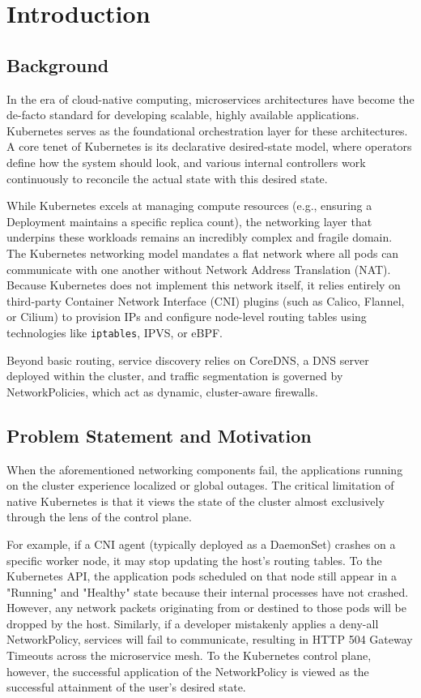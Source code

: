 \documentclass[12pt,a4paper]{article}
\begin{document}
\newpage
\tableofcontents
\newpage

\section{Introduction}
\onehalfspacing
\subsection{Background}
In the era of cloud-native computing, microservices architectures have become the de-facto standard for developing scalable, highly available applications. Kubernetes serves as the foundational orchestration layer for these architectures. A core tenet of Kubernetes is its declarative desired-state model, where operators define how the system should look, and various internal controllers work continuously to reconcile the actual state with this desired state. 

While Kubernetes excels at managing compute resources (e.g., ensuring a Deployment maintains a specific replica count), the networking layer that underpins these workloads remains an incredibly complex and fragile domain. The Kubernetes networking model mandates a flat network where all pods can communicate with one another without Network Address Translation (NAT). Because Kubernetes does not implement this network itself, it relies entirely on third-party Container Network Interface (CNI) plugins (such as Calico, Flannel, or Cilium) to provision IPs and configure node-level routing tables using technologies like \texttt{iptables}, IPVS, or eBPF. 

Beyond basic routing, service discovery relies on CoreDNS, a DNS server deployed within the cluster, and traffic segmentation is governed by NetworkPolicies, which act as dynamic, cluster-aware firewalls.

\subsection{Problem Statement and Motivation}
When the aforementioned networking components fail, the applications running on the cluster experience localized or global outages. The critical limitation of native Kubernetes is that it views the state of the cluster almost exclusively through the lens of the control plane. 

For example, if a CNI agent (typically deployed as a DaemonSet) crashes on a specific worker node, it may stop updating the host's routing tables. To the Kubernetes API, the application pods scheduled on that node still appear in a "Running" and "Healthy" state because their internal processes have not crashed. However, any network packets originating from or destined to those pods will be dropped by the host. Similarly, if a developer mistakenly applies a deny-all NetworkPolicy, services will fail to communicate, resulting in HTTP 504 Gateway Timeouts across the microservice mesh. To the Kubernetes control plane, however, the successful application of the NetworkPolicy is viewed as the successful attainment of the user's desired state.
\end{document}
